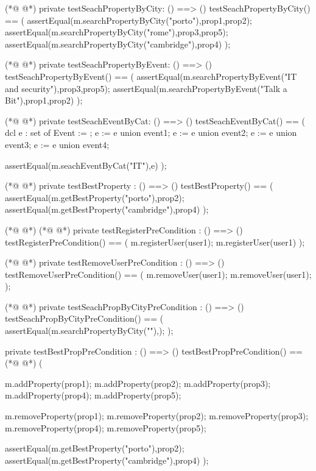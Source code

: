 \begin{vdmpp}[breaklines=true]
(*@
\label{testSeachPropertyByCity:300}
@*)
 private testSeachPropertyByCity: () ==> ()
  testSeachPropertyByCity() ==
  (
   assertEqual(m.searchPropertyByCity("porto"),{prop1,prop2});
   assertEqual(m.searchPropertyByCity("rome"),{prop3,prop5});
   assertEqual(m.searchPropertyByCity("cambridge"),{prop4})
  );
  
(*@
\label{testSeachPropertyByEvent:308}
@*)
 private testSeachPropertyByEvent: () ==> ()
  testSeachPropertyByEvent() ==
  (
   assertEqual(m.searchPropertyByEvent("IT and security"),{prop3,prop5});
   assertEqual(m.searchPropertyByEvent("Talk a Bit"),{prop1,prop2})
  );
  
(*@
\label{testSeachEventByCat:315}
@*)
 private testSeachEventByCat: () ==> ()
  testSeachEventByCat() ==
  (
   dcl e : set of Event := {};
   e := e union {event1};
   e := e union {event2};
   e := e union {event3};
   e := e union {event4};
   
   assertEqual(m.seachEventByCat("IT"),e)
  );
  
(*@
\label{testBestProperty:327}
@*)
 private testBestProperty : () ==> ()
  testBestProperty() ==
  (
   assertEqual(m.getBestProperty("porto"),prop2);
   assertEqual(m.getBestProperty("cambridge"),prop4)
  );
 
(*@
\label{testRegisterPreCondition:334}
@*)
(*@
\label{main:334}
@*)
 private testRegisterPreCondition : () ==> ()
  testRegisterPreCondition() ==
  (  
   m.registerUser(user1);
   m.registerUser(user1)
  );
  
(*@
\label{testRemoveUserPreCondition:341}
@*)
 private testRemoveUserPreCondition : () ==> ()
  testRemoveUserPreCondition() ==
  (   
   m.removeUser(user1);
   m.removeUser(user1);
  );
  
(*@
\label{testSeachPropByCityPreCondition:348}
@*)
 private testSeachPropByCityPreCondition : () ==> ()
  testSeachPropByCityPreCondition() ==
  (
   assertEqual(m.searchPropertyByCity(""),{});
  );
  
 private testBestPropPreCondition : () ==> ()
  testBestPropPreCondition() ==
(*@
\label{testBestPropPreCondition:356}
@*)
  (
  
   m.addProperty(prop1);
   m.addProperty(prop2);
   m.addProperty(prop3);
   m.addProperty(prop4);
   m.addProperty(prop5);
   
   m.removeProperty(prop1);
   m.removeProperty(prop2);
   m.removeProperty(prop3);
   m.removeProperty(prop4);
   m.removeProperty(prop5);
   
   assertEqual(m.getBestProperty("porto"),prop2);
   assertEqual(m.getBestProperty("cambridge"),prop4)
  );
  

\end{vdmpp}
